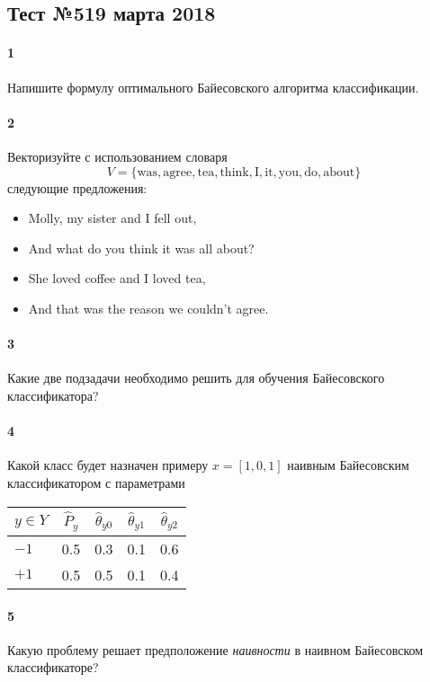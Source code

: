 \documentclass[a4paper,12pt]{article}
\begin{document}
  \subsection*{Тест №5\hfill{19 марта 2018}}

  \paragraph{1} Напишите формулу оптимального Байесовского алгоритма классификации.
  
  \makebox[\linewidth]{\hrulefill}
  \makebox[\linewidth]{\hrulefill}
  
  \paragraph{2} Векторизуйте с использованием словаря
  $$
  V = \{\text{was}, \text{agree}, \text{tea}, \text{think},
        \text{I}, \text{it}, \text{you}, \text{do}, \text{about}\}
  $$
  следующие предложения:
  \begin{itemize}
  \item Molly, my sister and I fell out,
  \item And what do you think it was all about?
  \item She loved coffee and I loved tea,
  \item And that was the reason we couldn't agree.
  \end{itemize}

  \paragraph{3} Какие две подзадачи необходимо решить для обучения Байесовского
  классификатора?

  \makebox[\linewidth]{\hrulefill}
  \makebox[\linewidth]{\hrulefill}
  \makebox[\linewidth]{\hrulefill}
  \makebox[\linewidth]{\hrulefill}

  \paragraph{4} Какой класс будет назначен примеру $x = [1, 0, 1]$
  наивным Байесовским классификатором с параметрами
  \begin{center}
    \begin{tabular}{l|c|ccc}
      $y \in Y$   & $\hat{P}_y$ & $\hat{\theta}_{y0}$ & $\hat{\theta}_{y1}$ & $\hat{\theta}_{y2}$ \\
      \hline
      ${-}1$      & 0.5    & 0.3      & 0.1     & 0.6   \\
      ${+}1$      & 0.5    & 0.5      & 0.1     & 0.4
    \end{tabular}
  \end{center}

  \vspace{4em}
  
  \paragraph{5} Какую проблему решает предположение \emph{наивности} в наивном
  Байесовском классификаторе?

  \makebox[\linewidth]{\hrulefill}
  \makebox[\linewidth]{\hrulefill}
  \makebox[\linewidth]{\hrulefill}
  \makebox[\linewidth]{\hrulefill}
  
\end{document}
